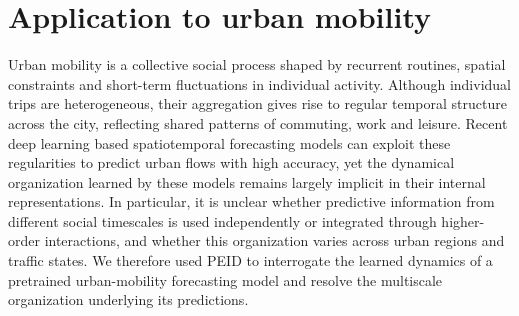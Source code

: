 \documentclass[fleqn,10pt]{wlscirep}
\newcommand{\rev}[1]{\textcolor{red}{#1}}
\theoremstyle{naturetheorem}
\begin{document}

\section*{Application to urban mobility}

Urban mobility is a collective social process shaped by recurrent routines, spatial constraints and short-term fluctuations in individual activity. Although individual trips are heterogeneous, their aggregation gives rise to regular temporal structure across the city, reflecting shared patterns of commuting, work and leisure. Recent deep learning based spatiotemporal forecasting models can exploit these regularities to predict urban flows with high accuracy, yet the dynamical organization learned by these models remains largely implicit in their internal representations. In particular, it is unclear whether predictive information from different social timescales is used independently or integrated through higher-order interactions, and whether this organization varies across urban regions and traffic states. We therefore used PEID to interrogate the learned dynamics of a pretrained urban-mobility forecasting model and resolve the multiscale organization underlying its predictions.
\end{document}
